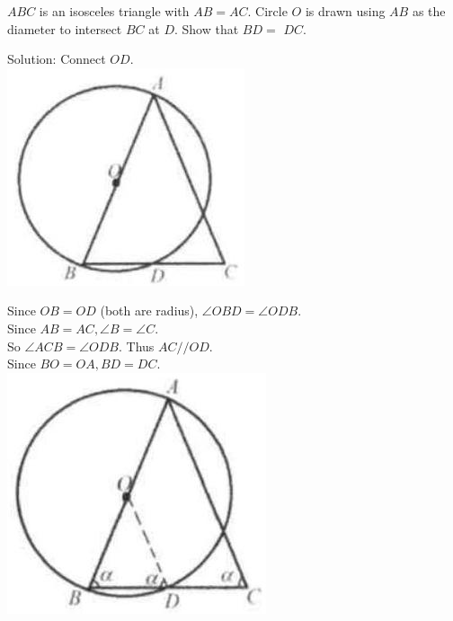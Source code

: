 \documentclass{article}
\begin{document}
\(A B C\) is an isosceles triangle with \(A B=A C\). Circle \(O\) is drawn using \(A B\) as the diameter to intersect \(B C\) at \(D\). Show that \(B D=\) \(D C\).

Solution:
Connect \(O D\).\\
\centering
\includegraphics[width=\textwidth]{images/147(2).jpg}

Since \(O B=O D\) (both are radius), \(\angle O B D=\angle O D B\).\\
Since \(A B=A C, \angle B=\angle C\).\\
So \(\angle A C B=\angle O D B\). Thus \(A C / / O D\).\\
Since \(B O=O A, B D=D C\).\\
\centering
\includegraphics[width=\textwidth]{images/147(1).jpg}
\end{document}
